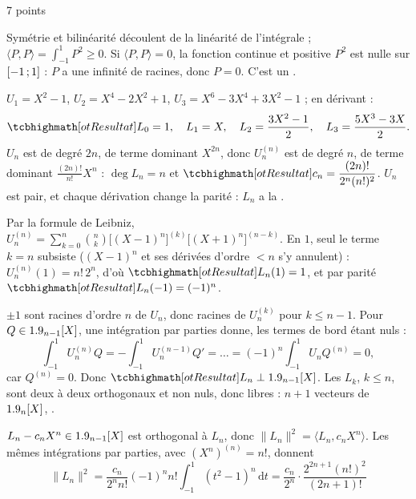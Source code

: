 
\enParties

\begin{corrigeEval}{7 points}{}
\begin{questions}
  \item Symétrie et bilinéarité découlent de la linéarité de l'intégrale ;
    $\langle P,P\rangle=\int_{-1}^{1}P^{2}\geqslant0$. Si
    $\langle P,P\rangle=0$, la fonction continue et positive $P^{2}$ est nulle
    sur $\mathopen{[}-1\,{;}\,1\mathclose{]}$ : $P$ a une infinité de racines, donc $P=0$. C'est
    un . \pts{1 pt}
  \item $U_1=X^{2}-1$, $U_2=X^{4}-2X^{2}+1$,
    $U_3=X^{6}-3X^{4}+3X^{2}-1$ ; en dérivant :
    \[\res{L_0=1,\quad L_1=X,\quad L_2=\frac{3X^{2}-1}{2},\quad L_3=\frac{5X^{3}-3X}{2}}.\]
    $U_n$ est de degré $2n$, de terme dominant $X^{2n}$, donc
    $U_n^{(n)}$ est de degré $n$, de terme dominant
    $\frac{(2n)!}{n!}X^{n}$ : $\deg L_n=n$ et
    $\res{c_n=\dfrac{(2n)!}{2^{n}(n!)^{2}}}$. $U_n$ est pair, et chaque
    dérivation change la parité : $L_n$ a la .
  \item Par la formule de Leibniz,
    $U_n^{(n)}=\sum_{k=0}^{n}\binom nk\bigl[(X-1)^{n}\bigr]^{(k)}\bigl[(X+1)^{n}\bigr]^{(n-k)}$.
    En $1$, seul le terme $k=n$ subsiste ($(X-1)^{n}$ et ses dérivées
    d'ordre $<n$ s'y annulent) : $U_n^{(n)}(1)=n!\,2^{n}$, d'où
    $\res{L_n(1)=1}$, et par parité $\res{L_n(-1)=(-1)^{n}}$. \pts{1 pt}
  \item $\pm1$ sont racines d'ordre $n$ de $U_n$, donc racines de
    $U_n^{(k)}$ pour $k\leqslant n-1$. Pour $Q\in1.9_{n-1}[X]$, une
    intégration par parties donne, les termes de bord étant nuls :
    \[\int_{-1}^{1}U_n^{(n)}Q=-\int_{-1}^{1}U_n^{(n-1)}Q'=\dots=(-1)^{n}\int_{-1}^{1}U_nQ^{(n)}=0,\]
    car $Q^{(n)}=0$. Donc $\res{L_n\perp\R_{n-1}[X]}$. Les $L_k$,
    $k\leqslant n$, sont deux à deux orthogonaux et non nuls, donc libres :
    $n+1$ vecteurs de $1.9_n[X]$, . 
  \item $L_n-c_nX^{n}\in1.9_{n-1}[X]$ est orthogonal à $L_n$, donc
    $\lVert L_n\rVert^{2}=\langle L_n,c_nX^{n}\rangle$. Les mêmes intégrations
    par parties, avec $(X^{n})^{(n)}=n!$, donnent
    \[\lVert L_n\rVert^{2}=\frac{c_n}{2^{n}n!}(-1)^{n}n!\int_{-1}^{1}(t^{2}-1)^{n}\,\mathrm{d}t
      =\frac{c_n}{2^{n}}\cdot\frac{2^{2n+1}(n!)^{2}}{(2n+1)!}
\]
\end{questions}
\end{corrigeEval}
